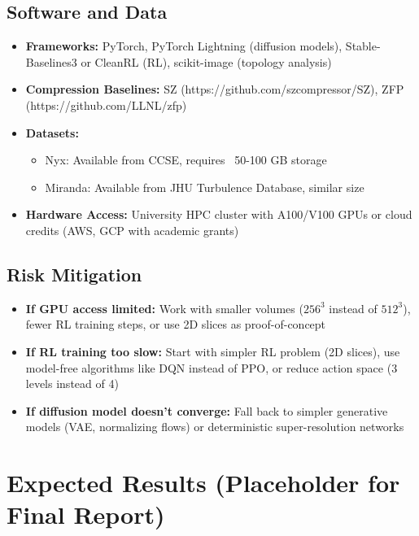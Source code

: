 \documentclass[11pt]{article}
\begin{document}
\subsection{Software and Data}

\begin{itemize}
    \item \textbf{Frameworks:} PyTorch, PyTorch Lightning (diffusion models), Stable-Baselines3 or CleanRL (RL), scikit-image (topology analysis)
    \item \textbf{Compression Baselines:} SZ (https://github.com/szcompressor/SZ), ZFP (https://github.com/LLNL/zfp)
    \item \textbf{Datasets:}
    \begin{itemize}
        \item Nyx: Available from CCSE, requires ~50-100 GB storage
        \item Miranda: Available from JHU Turbulence Database, similar size
    \end{itemize}
    \item \textbf{Hardware Access:} University HPC cluster with A100/V100 GPUs or cloud credits (AWS, GCP with academic grants)
\end{itemize}

\subsection{Risk Mitigation}

\begin{itemize}
    \item \textbf{If GPU access limited:} Work with smaller volumes ($256^3$ instead of $512^3$), fewer RL training steps, or use 2D slices as proof-of-concept

    \item \textbf{If RL training too slow:} Start with simpler RL problem (2D slices), use model-free algorithms like DQN instead of PPO, or reduce action space (3 levels instead of 4)

    \item \textbf{If diffusion model doesn't converge:} Fall back to simpler generative models (VAE, normalizing flows) or deterministic super-resolution networks
\end{itemize}

\section{Expected Results (Placeholder for Final Report)}
\end{document}
